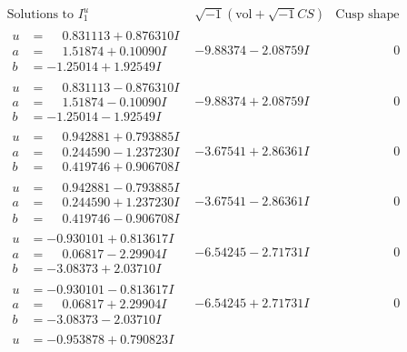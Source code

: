 \documentclass[1p]{elsarticle_modified}
\theoremstyle{definition}
\newcommand{\I}{\sqrt{-1}}
\begin{document}
$$\begin{array}{c|c|c}
\text{Solutions to }I^u_{1}& \I (\text{vol} + \sqrt{-1}CS) & \text{Cusp shape}\\
 \hline 
\begin{aligned}
u &= \phantom{-}0.831113 + 0.876310 I \\
a &= \phantom{-}1.51874 + 0.10090 I \\
b &= -1.25014 + 1.92549 I\end{aligned}
 & -9.88374 - 2.08759 I & \phantom{-0.000000 } 0 \\ \hline\begin{aligned}
u &= \phantom{-}0.831113 - 0.876310 I \\
a &= \phantom{-}1.51874 - 0.10090 I \\
b &= -1.25014 - 1.92549 I\end{aligned}
 & -9.88374 + 2.08759 I & \phantom{-0.000000 } 0 \\ \hline\begin{aligned}
u &= \phantom{-}0.942881 + 0.793885 I \\
a &= \phantom{-}0.244590 - 1.237230 I \\
b &= \phantom{-}0.419746 + 0.906708 I\end{aligned}
 & -3.67541 + 2.86361 I & \phantom{-0.000000 } 0 \\ \hline\begin{aligned}
u &= \phantom{-}0.942881 - 0.793885 I \\
a &= \phantom{-}0.244590 + 1.237230 I \\
b &= \phantom{-}0.419746 - 0.906708 I\end{aligned}
 & -3.67541 - 2.86361 I & \phantom{-0.000000 } 0 \\ \hline\begin{aligned}
u &= -0.930101 + 0.813617 I \\
a &= \phantom{-}0.06817 - 2.29904 I \\
b &= -3.08373 + 2.03710 I\end{aligned}
 & -6.54245 - 2.71731 I & \phantom{-0.000000 } 0 \\ \hline\begin{aligned}
u &= -0.930101 - 0.813617 I \\
a &= \phantom{-}0.06817 + 2.29904 I \\
b &= -3.08373 - 2.03710 I\end{aligned}
 & -6.54245 + 2.71731 I & \phantom{-0.000000 } 0 \\ \hline\begin{aligned}
u &= -0.953878 + 0.790823 I \\

\end{aligned}
\end{array}$$
\end{document}
